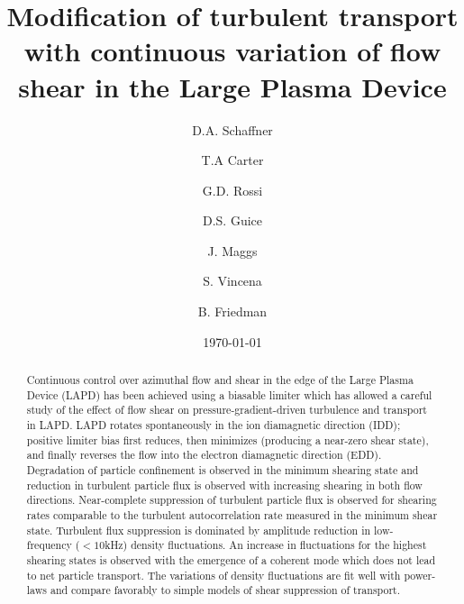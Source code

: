 \documentclass[aps,prl,amsmath,amssymb,reprint,superscriptaddress]{revtex4-1} %
\begin{document}
\title{Modification of turbulent transport with continuous variation of
  flow shear in the Large Plasma Device}
\author{D.A. Schaffner}
\author{T.A Carter}
\author{G.D. Rossi}
\author{D.S. Guice}
\author{J. Maggs}
\author{S. Vincena}
\author{B. Friedman}


\date{\today}

\begin{abstract}
Continuous control over azimuthal flow and shear in the edge of the Large Plasma Device (LAPD) has been achieved using a biasable limiter which has allowed a careful study of the effect of flow shear on pressure-gradient-driven turbulence and transport in LAPD. LAPD rotates spontaneously in the ion diamagnetic direction (IDD); positive limiter bias first reduces, then minimizes (producing a near-zero shear state), and finally reverses the flow into the electron diamagnetic direction (EDD). Degradation of particle confinement is observed in the minimum shearing state and reduction in turbulent particle flux is observed with increasing shearing in both flow directions. Near-complete suppression of turbulent particle flux is observed for shearing rates comparable to the turbulent autocorrelation rate measured in the minimum shear state.  Turbulent flux suppression is dominated by amplitude reduction in low-frequency ($<10$kHz) density fluctuations. An increase in fluctuations for the highest shearing states is observed with the emergence of a coherent mode which does not lead to net particle transport. The variations of density fluctuations are fit well with power-laws and compare favorably to simple models of shear suppression of transport.
\end{abstract}
\end{document}
